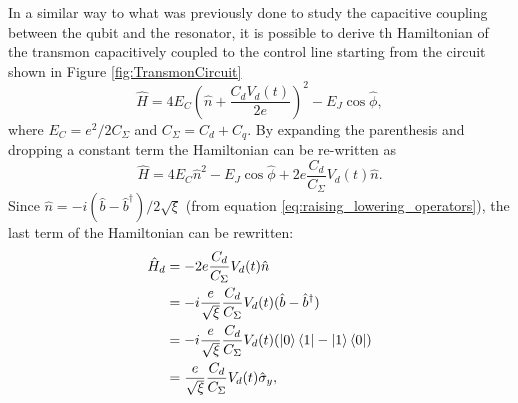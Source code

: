 In a similar way to what was previously done to study the capacitive coupling between the qubit and the resonator, it is possible to derive th Hamiltonian of the transmon capacitively coupled to the control line starting from the circuit shown in Figure \ref{fig:TransmonCircuit}
\begin{equation}
    \hat{H} = 4E_C \left(\hat{n} + \frac{C_d V_d(t)}{2e}\right)^2 - E_J \cos{\hat{\phi}},
\end{equation} 
where $E_C = e^2/2C_\Sigma$ and $C_\Sigma =  C_d + C_q$. By expanding the parenthesis and dropping a constant term the Hamiltonian can be re-written as
\begin{equation}\label{eq:tmp}
    \hat{H} =  4E_C\hat{n}^2 -E_J\cos{\hat{\phi}} + 2e\frac{C_d}{C_\Sigma}V_d(t)\hat{n}.
\end{equation}
Since $\hat{n} = -i(\hat{b}-\hat{b}^\dagger)/2\sqrt{\xi}$ (from equation \ref{eq:raising_lowering_operators}), the last term of the Hamiltonian can be rewritten:
\begin{align}\label{eq:misto}
    \hat{H}_d &= -2e\frac{C_d}{C_\Sigma}V_d(t)\hat{n}\\
    &=-i\frac{e}{\sqrt{\xi}}\frac{C_d}{C_{\Sigma}}V_d(t)(\hat{b}-\hat{b}^\dagger)\\
    &=-i\frac{e}{\sqrt{\xi}}\frac{C_d}{C_{\Sigma}}V_d(t)(\ket{0}\bra{1}-\ket{1}\bra{0})\\
    &=\frac{e}{\sqrt{\xi}}\frac{C_d}{C_{\Sigma}}V_d(t)\hat{\sigma}_y,
\end{align}

